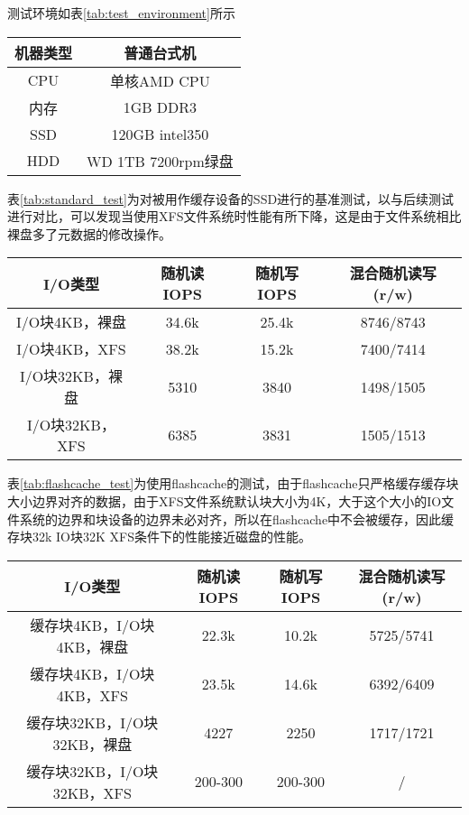 测试环境如表\ref{tab:test_environment}所示

\begin{table}[H]
    \centering
    \begin{tabular}{cc} \toprule
      机器类型 & 普通台式机 \\ \midrule
      CPU & 单核AMD CPU\\
      内存 & 1GB DDR3\\
      SSD & 120GB intel350 \\
      HDD & WD 1TB 7200rpm绿盘\\
      \bottomrule
    \end{tabular}
\end{table}

表\ref{tab:standard_test}为对被用作缓存设备的SSD进行的基准测试，以与后续测试进行对比，可以发现当使用XFS文件系统时性能有所下降，这是由于文件系统相比裸盘多了元数据的修改操作。

\begin{table}[H]
    \centering
    \begin{tabular}{cccc} 
      \toprule
      I/O类型 & 随机读IOPS & 随机写IOPS & 混合随机读写(r/w) \\ 
      \midrule
      I/O块4KB，裸盘 & 34.6k & 25.4k & 8746/8743 \\
      I/O块4KB，XFS & 38.2k & 15.2k & 7400/7414 \\
      I/O块32KB，裸盘 & 5310 & 3840 & 1498/1505 \\
      I/O块32KB，XFS & 6385 & 3831 & 1505/1513 \\
      \bottomrule
    \end{tabular}
\end{table}

表\ref{tab:flashcache_test}为使用flashcache的测试，由于flashcache只严格缓存缓存块大小边界对齐的数据，由于XFS文件系统默认块大小为4K，大于这个大小的IO文件系统的边界和块设备的边界未必对齐，所以在flashcache中不会被缓存，因此缓存块32k IO块32K XFS条件下的性能接近磁盘的性能。 

\begin{table}[H]
    \centering
    \begin{tabular}{cccc} 
      \toprule
      I/O类型 & 随机读IOPS & 随机写IOPS & 混合随机读写(r/w) \\ 
      \midrule
      缓存块4KB，I/O块4KB，裸盘 & 22.3k & 10.2k & 5725/5741 \\
      缓存块4KB，I/O块4KB，XFS & 23.5k & 14.6k & 6392/6409 \\
      缓存块32KB，I/O块32KB，裸盘 & 4227 & 2250 & 1717/1721 \\
      缓存块32KB，I/O块32KB，XFS & 200-300 & 200-300 & / \\
      \bottomrule
    \end{tabular}
\end{table}

